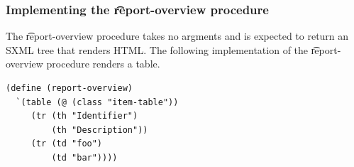 \subsubsection{Implementing the \t{report-overview} procedure}

  The \t{report-overview} procedure takes no argments and is expected to
  return an SXML tree that renders HTML.  The following implementation of
  the \t{report-overview} procedure renders a table.

\begin{siderules}
\begin{verbatim}
(define (report-overview)
  `(table (@ (class "item-table"))
     (tr (th "Identifier")
         (th "Description"))
     (tr (td "foo")
         (td "bar"))))
\end{verbatim}
\end{siderules}


